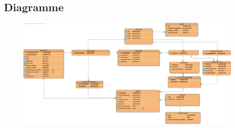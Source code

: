 \newpage
\subsection{Diagramme}
\begin{figure}[h]
\centering
\includegraphics[width = 1\textwidth]{Extension-claire/BDD-claire/img/BDD-claire.png}
\end{figure}